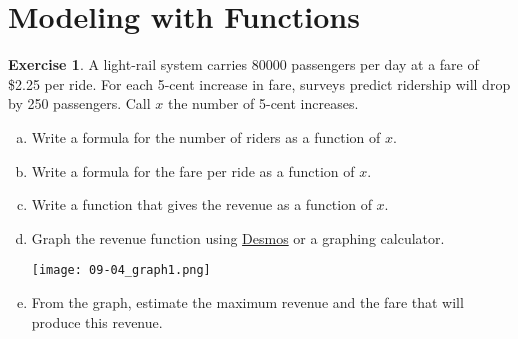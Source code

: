 \documentclass[11pt,reqno,final]{amsart}
\numberwithin{equation}{section}
\numberwithin{figure}{section}
\theoremstyle{definition} %
\newtheorem{exercise}{Exercise}
\begin{document}
\newpage




\section{Modeling with Functions}

\begin{exercise}
        A light-rail system carries 80000 passengers per day at a fare of \$2.25 per ride.
        For each 5-cent increase in fare, surveys predict ridership will drop by 250 passengers.
        Call $x$ the number of 5-cent increases.
        \begin{enumerate}[(a)]
        \item Write a formula for the number of riders as a function of $x$.
                \vfill
        \item Write a formula for the fare per ride as a function of $x$.
                \vfill
        \item Write a function that gives the revenue as a function of $x$.
                \vfill
        \item Graph the revenue function using \href{https://www.desmos.com/}{Desmos} or a graphing calculator.
                \begin{center}
                        \texttt{[image: 09-04\_graph1.png]}
                \end{center}
        \item From the graph, estimate the maximum revenue and the fare that will produce this revenue.
                \vfill
        \end{enumerate}
\end{exercise}

\newpage
\end{document}
